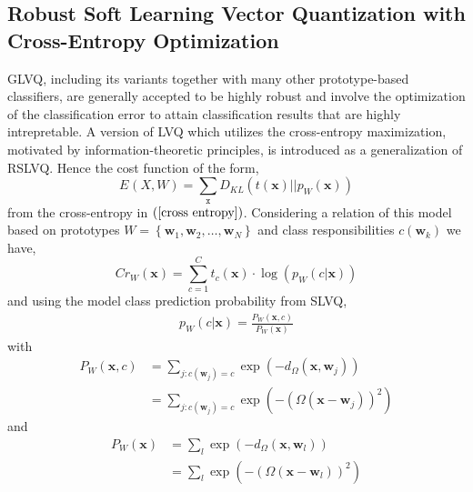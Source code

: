 \subsection{Robust Soft Learning Vector Quantization  with Cross-Entropy Optimization}
GLVQ, including its variants together with many other prototype-based classifiers, are generally accepted to be highly robust and involve the optimization of the classification error to attain classification results that are highly intrepretable\cite{kaden2014aspects}. A version of LVQ which utilizes the cross-entropy maximization, motivated by information-theoretic principles, is introduced as a generalization of RSLVQ\cite{villmann2018probabilistic}. 
Hence the cost function of the form,
\begin{equation*}%
	E_{}\left( X,W\right) =\sum_{\mathtt{x}}D_{KL}\left( t\left( \mathbf{x}\right) ||p_{W}\left(\mathbf {x}\right) \right) 
\end{equation*}
from the cross-entropy in $\left(\ref{cross entropy}\right) $. Considering a relation of this model based on prototypes\hspace{2pt} $W=\left\lbrace \mathbf{w}_{1},\mathbf{w}_{2},\ldots,\mathbf{w}_{N}\right\rbrace $ \hspace{2pt}and class responsibilities\hspace{2pt} $c\left( \mathbf{w}_{k}\right)$\hspace{2pt} we have,
\begin{equation*}%
	Cr_{W}\left( \mathbf{x}\right) =\sum_{c=1}^{C}t_{c}\left( \mathbf{x}\right) \cdot\log\left( p_{W}\left(c|\mathbf{x}\right) \right)  
\end{equation*}
and using the  model class prediction probability from SLVQ,
\begin{align*}
	p_{W}\left( c|\mathbf{x}\right)=\frac{P_{W}\left( \mathbf{x},c\right) }{P_{W}\left( \mathbf{x}\right) }
\end{align*}
with
\begin{align*}
	P_{W}\left( \mathbf{x},c\right) &= \sum_{j:c\left( \mathbf{w}_{j}\right) = c}\exp\left( -d_{\Omega}\left( \mathbf{x},\mathbf{w}_{j}\right) \right)\\
	&= \sum_{j:c\left( \mathbf{w}_{j}\right) = c}\exp\left(-\left( \Omega\left( \mathbf{x}- \mathbf{w}_{j}\right)\right) ^2 \right)
\end{align*}
and 
\begin{align*}
	P_{W}\left( \mathbf{x}\right) &= \sum_{l}\exp\left( -d_{\Omega}\left( \mathbf{x},\mathbf{w}_{l}\right) \right)\\
	&=\sum_{l}\exp\left(-\left( \Omega\left( \mathbf{x}- \mathbf{w}_{l}\right)\right) ^2 \right)
\end{align*}

